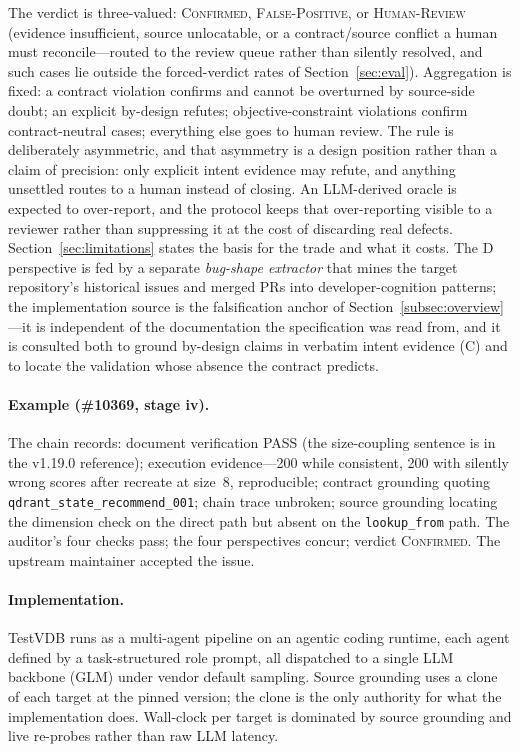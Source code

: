 \documentclass[acmsmall,screen,review,anonymous]{acmart}
\newcommand{\system}{TestVDB}
\begin{document}
The verdict is three-valued: \textsc{Confirmed}, \textsc{False-Positive}, or \textsc{Human-Review} (evidence insufficient, source unlocatable, or a contract/source conflict a human must reconcile---routed to the review queue rather than silently resolved, and such cases lie outside the forced-verdict rates of Section~\ref{sec:eval}). Aggregation is fixed: a contract violation confirms and cannot be overturned by source-side doubt; an explicit by-design refutes; objective-constraint violations confirm contract-neutral cases; everything else goes to human review. The rule is deliberately asymmetric, and that asymmetry is a design position rather than a claim of precision: only explicit intent evidence may refute, and anything unsettled routes to a human instead of closing. An LLM-derived oracle is expected to over-report, and the protocol keeps that over-reporting visible to a reviewer rather than suppressing it at the cost of discarding real defects. Section~\ref{sec:limitations} states the basis for the trade and what it costs. The D perspective is fed by a separate \emph{bug-shape extractor} that mines the target repository's historical issues and merged PRs into developer-cognition patterns; the implementation source is the falsification anchor of Section~\ref{subsec:overview}---it is independent of the documentation the specification was read from, and it is consulted both to ground by-design claims in verbatim intent evidence (C) and to locate the validation whose absence the contract predicts.

\paragraph{Example (\#10369, stage iv).}
The chain records: document verification PASS (the size-coupling sentence is in the v1.19.0 reference); execution evidence---200 while consistent, 200 with silently wrong scores after recreate at size~8, reproducible; contract grounding quoting \texttt{qdrant\_state\_recommend\_001}; chain trace unbroken; source grounding locating the dimension check on the direct path but absent on the \texttt{lookup\_from} path. The auditor's four checks pass; the four perspectives concur; verdict \textsc{Confirmed}. The upstream maintainer accepted the issue.

\paragraph{Implementation.}
\system{} runs as a multi-agent pipeline on an agentic coding runtime, each agent defined by a task-structured role prompt, all dispatched to a single LLM backbone (GLM) under vendor default sampling. Source grounding uses a clone of each target at the pinned version; the clone is the only authority for what the implementation does. Wall-clock per target is dominated by source grounding and live re-probes rather than raw LLM latency.
\end{document}
